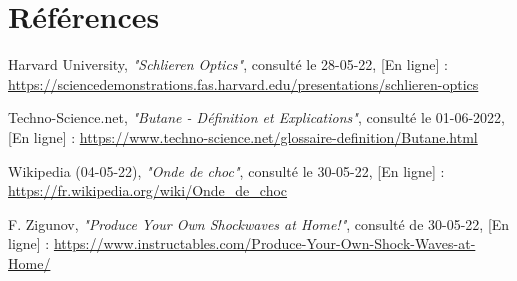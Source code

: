 \section*{Références}
\parindent0pt
\begin{enumerate}[label = {[\arabic*]}]
	\item Harvard University, \textit{"Schlieren Optics"}, consulté le 28-05-22, [En ligne] : \small\url{https://sciencedemonstrations.fas.harvard.edu/presentations/schlieren-optics}\label{ref:harvardedu}
	\item Techno-Science.net, \textit{"Butane - Définition et Explications"}, consulté le 01-06-2022, [En ligne] : \small{\url{https://www.techno-science.net/glossaire-definition/Butane.html}}
	\label{ref:techno_science}
	\item Wikipedia (04-05-22), \textit{"Onde de choc"}, consulté le 30-05-22, [En ligne] : \small\url{https://fr.wikipedia.org/wiki/Onde_de_choc}
	\label{ref:wiki_choc}
	\item F. Zigunov, \textit{"Produce Your Own Shockwaves at Home!"}, consulté de 30-05-22, [En ligne] : \small\url{https://www.instructables.com/Produce-Your-Own-Shock-Waves-at-Home/}
	\label{ref:zigunov}
\end{enumerate}